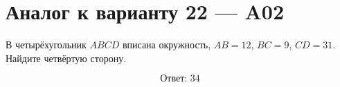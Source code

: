 


\section*{Аналог к варианту 22 — A02}
В четырёхугольник \(ABCD\) вписана окружность, \(AB=12\), \(BC=9\), \(CD=31\). Найдите четвёртую сторону.
\begin{center}\end{center}
\[\boxed{\text{Ответ: }34}\]

